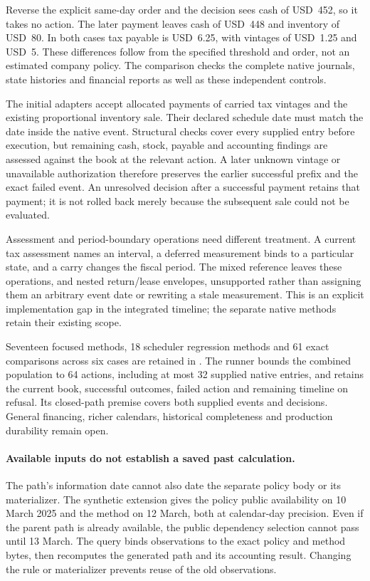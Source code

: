 Reverse the explicit same-day order and the decision sees cash of USD~452,
so it takes no action. The later payment leaves cash of USD~448 and inventory
of USD~80. In both cases tax payable is USD~6.25, with vintages of USD~1.25 and
USD~5. These differences follow from the specified threshold and order, not an
estimated company policy. The comparison checks the complete native journals,
state histories and financial reports as well as these independent controls.

The initial adapters accept allocated payments of carried tax vintages and the
existing proportional inventory sale. Their declared schedule date must match
the date inside the native event. Structural checks cover every supplied entry
before execution, but remaining cash, stock, payable and accounting findings
are assessed against the book at the relevant action. A later unknown vintage
or unavailable authorization therefore preserves the earlier successful prefix
and the exact failed event. An unresolved decision after a successful payment
retains that payment; it is not rolled back merely because the subsequent sale
could not be evaluated.

Assessment and period-boundary operations need different treatment. A current
tax assessment names an interval, a deferred measurement binds to a particular
state, and a carry changes the fiscal period. The mixed reference leaves these
operations, and nested return/lease envelopes, unsupported rather than assigning
them an arbitrary event date or rewriting a stale measurement. This is an
explicit implementation gap in the integrated timeline; the separate native
methods retain their existing scope.

Seventeen focused methods, 18 scheduler regression methods and 61 exact
comparisons across six cases are retained in
. The runner bounds
the combined population to 64 actions, including at most 32 supplied native
entries, and retains the current book, successful outcomes, failed action and
remaining timeline on refusal. Its closed-path premise covers both supplied
events and decisions. General financing, richer calendars, historical
completeness and production durability remain open.


\paragraph{Available inputs do not establish a saved past calculation.}
The path's information date cannot also date the separate policy body or its
materializer. The synthetic extension gives the policy public availability on
10 March 2025 and the method on 12 March, both at calendar-day precision.
Even if the parent path is already available, the public dependency selection
cannot pass until 13 March. The query binds observations to the exact policy
and method bytes, then recomputes the generated path and its accounting result.
Changing the rule or materializer prevents reuse of the old observations.

